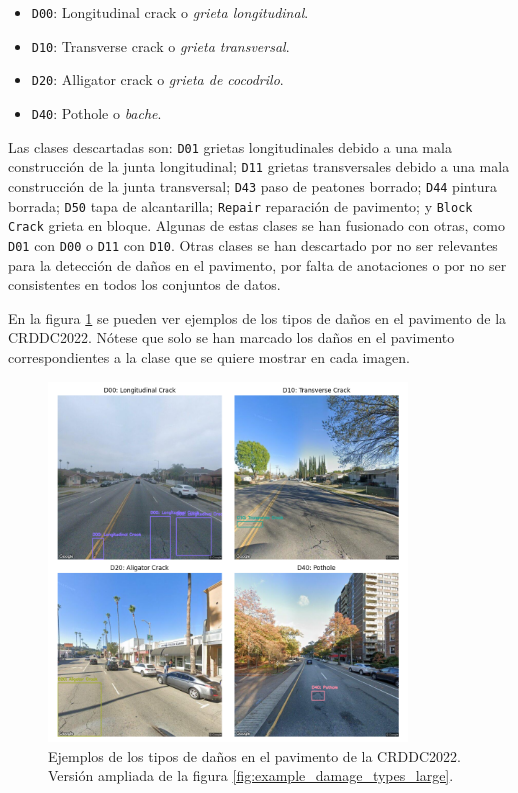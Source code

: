 \begin{itemize}
    \item \texttt{D00}: Longitudinal crack o \textit{grieta longitudinal}.
    \item \texttt{D10}: Transverse crack o \textit{grieta transversal}.
    \item \texttt{D20}: Alligator crack o \textit{grieta de cocodrilo}.
    \item \texttt{D40}: Pothole o \textit{bache}.
\end{itemize}

Las clases descartadas son: \texttt{D01} grietas longitudinales debido a una mala construcción de la junta longitudinal; \texttt{D11} grietas transversales debido a una mala construcción de la junta transversal; \texttt{D43} paso de peatones borrado; \texttt{D44} pintura borrada; \texttt{D50} tapa de alcantarilla; \texttt{Repair} reparación de pavimento; y \texttt{Block Crack} grieta en bloque. Algunas de estas clases se han fusionado con otras, como \texttt{D01} con \texttt{D00} o \texttt{D11} con \texttt{D10}. Otras clases se han descartado por no ser relevantes para la detección de daños en el pavimento, por falta de anotaciones o por no ser consistentes en todos los conjuntos de datos.

En la figura \ref{fig:example_damage_types} se pueden ver ejemplos de los tipos de daños en el pavimento de la CRDDC2022. Nótese que solo se han marcado los daños en el pavimento correspondientes a la clase que se quiere mostrar en cada imagen.

\begin{figure}[H]
    \centering
    \includegraphics[width=0.85\textwidth]{img/example_damage_types_grid.png}
    \caption{Ejemplos de los tipos de daños en el pavimento de la CRDDC2022. Versión ampliada de la figura \ref{fig:example_damage_types_large}.}
    \label{fig:example_damage_types}
\end{figure}

